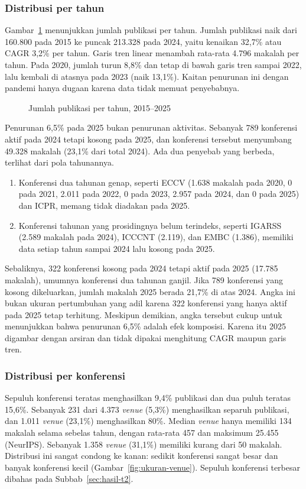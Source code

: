 \subsubsection{Distribusi per tahun}
\label{sec:hasil-tahun}
Gambar~\ref{fig:per-tahun} menunjukkan jumlah publikasi per tahun. Jumlah publikasi naik dari 160.800 pada 2015 ke puncak 213.328 pada 2024, yaitu kenaikan 32,7\% atau CAGR 3,2\% per tahun. Garis tren linear menambah rata-rata 4.796 makalah per tahun. Pada 2020, jumlah turun 8,8\% dan tetap di bawah garis tren sampai 2022, lalu kembali di atasnya pada 2023 (naik 13,1\%). Kaitan penurunan ini dengan pandemi hanya dugaan karena data tidak memuat penyebabnya.

\begin{figure}[ht]
\centering
{}
\caption{Jumlah publikasi per tahun, 2015--2025}
\label{fig:per-tahun}
\end{figure}

\label{sec:hasil-2025}
Penurunan 6,5\% pada 2025 bukan penurunan aktivitas. Sebanyak 789 konferensi aktif pada 2024 tetapi kosong pada 2025, dan konferensi tersebut menyumbang 49.328 makalah (23,1\% dari total 2024). Ada dua penyebab yang berbeda, terlihat dari pola tahunannya.
\begin{enumerate}
\item Konferensi dua tahunan genap, seperti ECCV (1.638 makalah pada 2020, 0 pada 2021, 2.011 pada 2022, 0 pada 2023, 2.957 pada 2024, dan 0 pada 2025) dan ICPR, memang tidak diadakan pada 2025.
\item Konferensi tahunan yang prosidingnya belum terindeks, seperti IGARSS (2.589 makalah pada 2024), ICCCNT (2.119), dan EMBC (1.386), memiliki data setiap tahun sampai 2024 lalu kosong pada 2025.
\end{enumerate}
Sebaliknya, 322 konferensi kosong pada 2024 tetapi aktif pada 2025 (17.785 makalah), umumnya konferensi dua tahunan ganjil. Jika 789 konferensi yang kosong dikeluarkan, jumlah makalah 2025 berada 21,7\% di atas 2024. Angka ini bukan ukuran pertumbuhan yang adil karena 322 konferensi yang hanya aktif pada 2025 tetap terhitung. Meskipun demikian, angka tersebut cukup untuk menunjukkan bahwa penurunan 6,5\% adalah efek komposisi. Karena itu 2025 digambar dengan arsiran dan tidak dipakai menghitung CAGR maupun garis tren.

\subsubsection{Distribusi per konferensi}
\label{sec:hasil-konferensi}
Sepuluh konferensi teratas menghasilkan 9,4\% publikasi dan dua puluh teratas 15,6\%. Sebanyak 231 dari 4.373 \textit{venue} (5,3\%) menghasilkan separuh publikasi, dan 1.011 \textit{venue} (23,1\%) menghasilkan 80\%. Median \textit{venue} hanya memiliki 134 makalah selama sebelas tahun, dengan rata-rata 457 dan maksimum 25.455 (NeurIPS). Sebanyak 1.358 \textit{venue} (31,1\%) memiliki kurang dari 50 makalah. Distribusi ini sangat condong ke kanan: sedikit konferensi sangat besar dan banyak konferensi kecil (Gambar~\ref{fig:ukuran-venue}). Sepuluh konferensi terbesar dibahas pada Subbab~\ref{sec:hasil-t2}.

